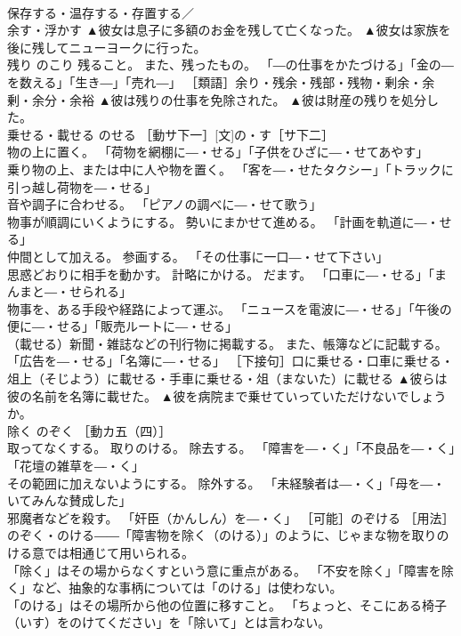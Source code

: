 \documentclass[8pt]{extreport}
\begin{document}
\begin{CJK}{UTF8}{min}
\\	保存する・温存する・存置する／
\\	余す・浮かす	▲彼女は息子に多額のお金を残して亡くなった。 ▲彼女は家族を後に残してニューヨークに行った。
\\	残り	のこり	残ること。 また、残ったもの。 「―の仕事をかたづける」「金の―を数える」「生き―」「売れ―」 ［類語］余り・残余・残部・残物・剰余・余剰・余分・余裕	▲彼は残りの仕事を免除された。 ▲彼は財産の残りを処分した。
\\	乗せる・載せる	のせる	［動サ下一］[文]の・す［サ下二］ 
\\	物の上に置く。 「荷物を網棚に―・せる」「子供をひざに―・せてあやす」 
\\	乗り物の上、または中に人や物を置く。 「客を―・せたタクシー」「トラックに引っ越し荷物を―・せる」 
\\	音や調子に合わせる。 「ピアノの調べに―・せて歌う」 
\\	物事が順調にいくようにする。 勢いにまかせて進める。 「計画を軌道に―・せる」 
\\	仲間として加える。 参画する。 「その仕事に一口―・せて下さい」 
\\	思惑どおりに相手を動かす。 計略にかける。 だます。 「口車に―・せる」「まんまと―・せられる」 
\\	物事を、ある手段や経路によって運ぶ。 「ニュースを電波に―・せる」「午後の便に―・せる」「販売ルートに―・せる」 
\\	（載せる）新聞・雑誌などの刊行物に掲載する。 また、帳簿などに記載する。 「広告を―・せる」「名簿に―・せる」 ［下接句］口に乗せる・口車に乗せる・俎上（そじよう）に載せる・手車に乗せる・俎（まないた）に載せる	▲彼らは彼の名前を名簿に載せた。 ▲彼を病院まで乗せていっていただけないでしょうか。
\\	除く	のぞく	［動カ五（四）］ 
\\	取ってなくする。 取りのける。 除去する。 「障害を―・く」「不良品を―・く」「花壇の雑草を―・く」 
\\	その範囲に加えないようにする。 除外する。 「未経験者は―・く」「母を―・いてみんな賛成した」 
\\	邪魔者などを殺す。 「奸臣（かんしん）を―・く」 ［可能］のぞける ［用法］のぞく・のける――「障害物を除く（のける）」のように、じゃまな物を取りのける意では相通じて用いられる。 
\\	「除く」はその場からなくすという意に重点がある。 「不安を除く」「障害を除く」など、抽象的な事柄については「のける」は使わない。 
\\	「のける」はその場所から他の位置に移すこと。 「ちょっと、そこにある椅子（いす）をのけてください」を「除いて」とは言わない。 

\end{CJK}
\end{document}
